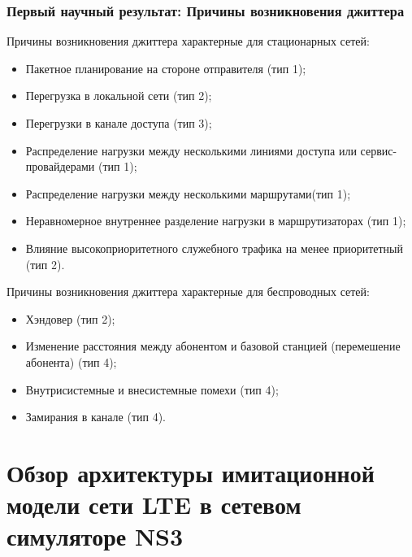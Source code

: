 \documentclass[10pt,pdf,hyperref={unicode}]{beamer}
\begin{document}
\begin{frame}
\frametitle{Первый научный результат: Причины возникновения джиттера}
{\footnotesize
\begin{exampleblock}
{Причины возникновения джиттера характерные для стационарных сетей:}
\begin{itemize}
\item Пакетное планирование на стороне отправителя (тип 1);
\item Перегрузка в локальной сети (тип 2);
\item Перегрузки в канале доступа (тип 3);
\item Распределение нагрузки между несколькими линиями доступа или сервис-провайдерами (тип 1);
\item Распределение нагрузки между несколькими маршрутами(тип 1);
\item Неравномерное внутреннее разделение нагрузки в маршрутизаторах (тип 1);
\item Влияние высокоприоритетного служебного трафика на менее приоритетный (тип 2).
\end{itemize}
\end{exampleblock}

\begin{exampleblock}
{Причины возникновения джиттера характерные для беспроводных сетей:}
\begin{itemize}
\item Хэндовер (тип 2);
\item Изменение расстояния между абонентом и базовой станцией (перемешение абонента) (тип 4);
\item Внутрисистемные и внесистемные помехи (тип 4);
\item Замирания в канале (тип 4).
\end{itemize}
\end{exampleblock}
}
\end{frame}







\section{Обзор архитектуры имитационной модели сети LTE в сетевом симуляторе NS3}
\end{document}
